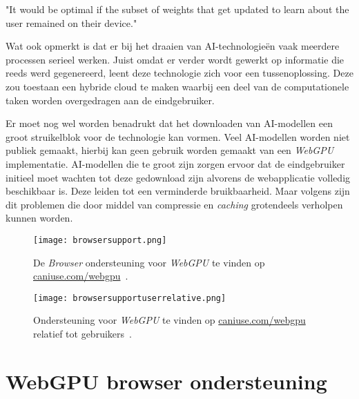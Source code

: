 \begin{displayquote}
    "It would be optimal if the subset of weights that get updated to learn about the user remained on their device."
\end{displayquote}

Wat \textcite{Fleetwood2022} ook opmerkt is dat er bij het draaien van  AI-technologieën vaak meerdere processen serieel werken. Juist omdat er verder wordt gewerkt op informatie die reeds werd gegenereerd, leent deze technologie zich voor een tussenoplossing. Deze zou toestaan een hybride cloud te maken waarbij een deel van de computationele taken worden overgedragen aan de eindgebruiker.

\bigbreak{}

Er moet nog wel worden benadrukt dat het downloaden van AI-modellen een groot struikelblok voor de technologie kan vormen. Veel AI-modellen worden niet publiek gemaakt, hierbij kan geen gebruik worden gemaakt van een \textit{WebGPU} implementatie. AI-modellen die te groot zijn zorgen ervoor dat de eindgebruiker initieel moet wachten tot deze gedownload zijn alvorens de webapplicatie volledig beschikbaar is. Deze leiden tot een verminderde bruikbaarheid. Maar volgens \textcite{Fleetwood2022} zijn dit problemen die door middel van compressie en \textit{caching} grotendeels verholpen kunnen worden.

\break{}

\begin{figure}
    \texttt{[image: browsersupport.png]}
    \caption[Ondersteuning voor \textit{WebGPU}~\autocite{Deveria2024}]{
        De \textit{Browser} ondersteuning voor \textit{WebGPU} te vinden op \href{https://caniuse.com/webgpu}{caniuse.com/webgpu}~\autocite{Deveria2024}.
    }
    \label{fig:Browser Support}
\end{figure}

\begin{figure}
    \texttt{[image: browsersupportuserrelative.png]}
    \caption[\textit{Browser} gebruiker toegang tot \textit{WebGPU}~\autocite{Deveria2024}]{
        Ondersteuning voor \textit{WebGPU} te vinden op \href{https://caniuse.com/webgpu}{caniuse.com/webgpu} relatief tot gebruikers~\autocite{Deveria2024}.
    }
    \label{fig:Relative Browser Support}
\end{figure}

\section{WebGPU browser ondersteuning}

